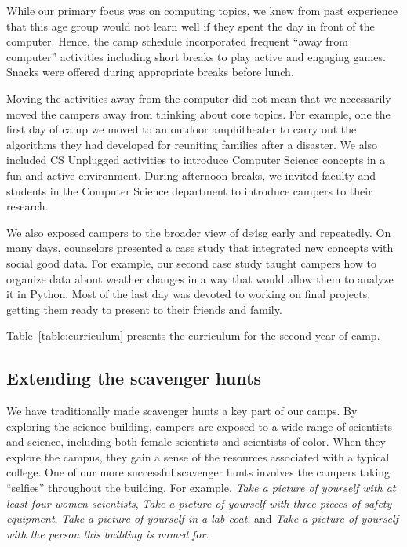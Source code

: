 While our primary focus was on computing topics, we knew from past
experience that this age group
would not learn well if they spent the day in front of the computer.
Hence, the camp schedule incorporated frequent ``away from computer''
activities including short breaks to play active and engaging games.
Snacks were offered during appropriate breaks before lunch. 

Moving the activities away from the computer did not mean that we
necessarily moved the campers away from thinking about core topics.
For example, one the first day of camp we moved to an outdoor
amphitheater to carry out the algorithms they had developed for
reuniting families after a disaster.  We also included CS Unplugged
\cite{csunplugged} activities to introduce Computer Science concepts
in a fun and active environment.  During afternoon breaks, we invited
faculty and students in the Computer Science department to introduce
campers to their research.

We also exposed campers to the broader view of ds4sg early and
repeatedly.  On many days, counselors presented a case study that
integrated new concepts with social good data. For example, our
second case study taught campers how to organize data about weather
changes in a way that would allow them to analyze it in Python.
Most of the last day was devoted to working on final projects,
getting them ready to present to their friends and family.

Table~\ref{table:curriculum} presents the curriculum for the
second year of camp.

\subsection{Extending the scavenger hunts}

We have traditionally made scavenger hunts a key part of our camps.
By exploring the science building, campers are exposed to
a wide range of scientists and science, including both female
scientists and scientists of color.  When they explore
the campus, they gain a sense of the resources associated with
a typical college.  One of our more successful
scavenger hunts involves the campers taking ``selfies'' throughout
the building.  For example, \textit{Take a picture of yourself with at
least four women scientists}, \textit{Take a picture of yourself with
three pieces of safety equipment}, \textit{Take a picture of yourself
in a lab coat},  and \textit{Take a picture of yourself with the person this
building is named for}.

